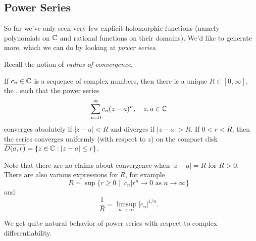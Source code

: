 \documentclass[a4paper]{scrartcl}
\begin{document}
\subsection{Power Series}

So far we've only seen very few explicit holomorphic functions (namely polynomials on $\mathbb{C}$ and rational functions on their domains). We'd like to generate more, which we can do by looking at \emph{power series}.

Recall the notion of \emph{radius of convergence}.

\begin{theorem}
    If $c_n \in \mathbb{C}$ is a sequence of complex numbers, then there is a unique $R \in [0, \infty]$, the , such that the power series
    $$
\sum_{n = 0}^{\infty} c_n(z - a)^n, \quad z, a \in \mathbb{C}
    $$
    converges absolutely if $|z - a| < R$ and diverges if $|z - a| > R$. If $0 < r < R$, then the series converges uniformly (with respect to $z$) on the compact disk $\overline{D(a, r)} = \{z \in \mathbb{C} : |z - a| \leq r\}$.
\end{theorem}

Note that there are no claims about convergence when $|z - a| = R$ for $R > 0$. There are also various expressions for $R$, for example
$$
R = \sup \{r \geq 0 \mid |c_n|r^n \rightarrow 0 \text{ as } n \rightarrow \infty \}
$$
and
$$
\frac{1}{R} = \limsup_{n \to \infty} |c_n|^{1/n}.
$$

We get quite natural behavior of power series with respect to complex differentiability.
\end{document}
